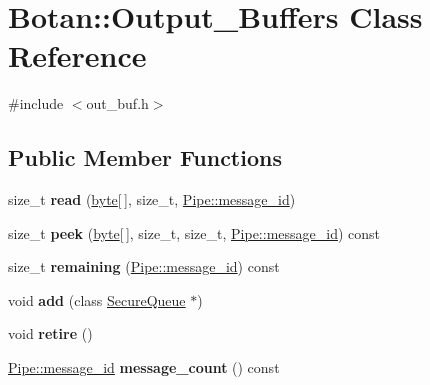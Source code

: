 \hypertarget{classBotan_1_1Output__Buffers}{\section{Botan\-:\-:Output\-\_\-\-Buffers Class Reference}
\label{classBotan_1_1Output__Buffers}
}


{\ttfamily \#include $<$out\-\_\-buf.\-h$>$}

\subsection*{Public Member Functions}
\begin{DoxyCompactItemize}
\item 
\hypertarget{classBotan_1_1Output__Buffers_a1bc89baff39c39f1074370cac8d4bff0}{size\-\_\-t {\bfseries read} (\hyperlink{namespaceBotan_a7d793989d801281df48c6b19616b8b84}{byte}\mbox{[}$\,$\mbox{]}, size\-\_\-t, \hyperlink{classBotan_1_1Pipe_a122c19120c1c21f270b6b6225ca9883c}{Pipe\-::message\-\_\-id})}\label{classBotan_1_1Output__Buffers_a1bc89baff39c39f1074370cac8d4bff0}

\item 
\hypertarget{classBotan_1_1Output__Buffers_aa632ba471561ea470ce57f4ca73f5719}{size\-\_\-t {\bfseries peek} (\hyperlink{namespaceBotan_a7d793989d801281df48c6b19616b8b84}{byte}\mbox{[}$\,$\mbox{]}, size\-\_\-t, size\-\_\-t, \hyperlink{classBotan_1_1Pipe_a122c19120c1c21f270b6b6225ca9883c}{Pipe\-::message\-\_\-id}) const }\label{classBotan_1_1Output__Buffers_aa632ba471561ea470ce57f4ca73f5719}

\item 
\hypertarget{classBotan_1_1Output__Buffers_af6083a2e9ca81c56fce7d6ee747f9ba5}{size\-\_\-t {\bfseries remaining} (\hyperlink{classBotan_1_1Pipe_a122c19120c1c21f270b6b6225ca9883c}{Pipe\-::message\-\_\-id}) const }\label{classBotan_1_1Output__Buffers_af6083a2e9ca81c56fce7d6ee747f9ba5}

\item 
\hypertarget{classBotan_1_1Output__Buffers_a9518ee1c272a642dd4bff9c5bef39a31}{void {\bfseries add} (class \hyperlink{classBotan_1_1SecureQueue}{Secure\-Queue} $\ast$)}\label{classBotan_1_1Output__Buffers_a9518ee1c272a642dd4bff9c5bef39a31}

\item 
\hypertarget{classBotan_1_1Output__Buffers_ad596042985f02c23dfb856d938a2d332}{void {\bfseries retire} ()}\label{classBotan_1_1Output__Buffers_ad596042985f02c23dfb856d938a2d332}

\item 
\hypertarget{classBotan_1_1Output__Buffers_abc780e78e79de8c8a87debd734d88aef}{\hyperlink{classBotan_1_1Pipe_a122c19120c1c21f270b6b6225ca9883c}{Pipe\-::message\-\_\-id} {\bfseries message\-\_\-count} () const }\label{classBotan_1_1Output__Buffers_abc780e78e79de8c8a87debd734d88aef}

\end{DoxyCompactItemize}


